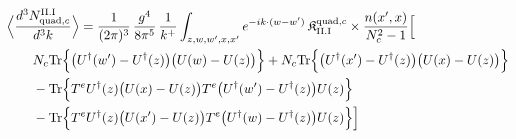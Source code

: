 \begingroup\small
\begin{align}\label{eq:S-II.I-2c}
&\Big\langle\frac{d^{3}N^{\rm II.I}_{{\rm quad},c}}{d^{3}k}\Big\rangle=\frac{1}{(2\pi)^{3}}\, \frac{g^{4}}{8\pi^{5}}\, \frac{1}{k^{+}} \int_{z,w,w',x,x'}e^{-ik\cdot(w-w')}\, \mathfrak{K}^{{\rm quad},c}_{\rm II.I} \times\frac{n(x',x)}{N_{c}^{2}-1}\Big[\notag\\
&\quad\quad N_{c}{\rm Tr}\Big\{\big(U^{\dagger}(w')-U^{\dagger}(z)\big)\big(U(w)-U(z)\big)\Big\} +N_{c}{\rm Tr}\Big\{\big(U^{\dagger}(x')-U^{\dagger}(z)\big)\big(U(x)-U(z)\big)\Big\}\notag\\
&\quad\quad -{\rm Tr}\Big\{T^{e}U^{\dagger}(z)\big(U(x)-U(z)\big)T^{e}\big(U^{\dagger}(w')-U^{\dagger}(z)\big)U(z)\Big\}\notag\\
&\quad\quad -{\rm Tr}\Big\{T^{e}U^{\dagger}(z)\big(U(x')-U(z)\big)T^{e}\big(U^{\dagger}(w)-U^{\dagger}(z)\big)U(z)\Big\}\Big]
\end{align}
\endgroup
